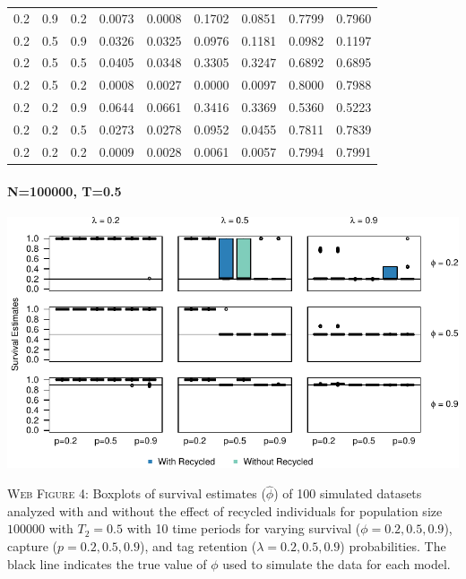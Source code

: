 \documentclass[]{article}
\let\oldparagraph\paragraph
\renewcommand{\paragraph}[1]{\oldparagraph{#1}\mbox{}}
\begin{document}
\begin{table}[ht]
{\begin{tabular}{rrrrrrrrr}
  0.2 & 0.9 & 0.2 & 0.0073 & 0.0008 & 0.1702 & 0.0851 & 0.7799 & 0.7960 \\ 
  0.2 & 0.5 & 0.9 & 0.0326 & 0.0325 & 0.0976 & 0.1181 & 0.0982 & 0.1197 \\ 
  0.2 & 0.5 & 0.5 & 0.0405 & 0.0348 & 0.3305 & 0.3247 & 0.6892 & 0.6895 \\ 
  0.2 & 0.5 & 0.2 & 0.0008 & 0.0027 & 0.0000 & 0.0097 & 0.8000 & 0.7988 \\ 
  0.2 & 0.2 & 0.9 & 0.0644 & 0.0661 & 0.3416 & 0.3369 & 0.5360 & 0.5223 \\ 
  0.2 & 0.2 & 0.5 & 0.0273 & 0.0278 & 0.0952 & 0.0455 & 0.7811 & 0.7839 \\ 
  0.2 & 0.2 & 0.2 & 0.0009 & 0.0028 & 0.0061 & 0.0057 & 0.7994 & 0.7991 \\ 
   \hline
\end{tabular}
}
\endgroup
\end{table}

\newpage

\paragraph{N=100000, T=0.5}\label{n100000-t0.5}

\includegraphics{Appendix_files/figure-latex/figure4_survival_GJSTL3-1.pdf}

\textsc{Web Figure 4:} Boxplots of survival estimates (\(\hat{\phi}\))
of 100 simulated datasets analyzed with and without the effect of
recycled individuals for population size \(100000\) with \(T_2=0.5\)
with 10 time periods for varying survival (\(\phi=0.2,0.5,0.9\)),
capture (\(p=0.2,0.5,0.9\)), and tag retention (\(\lambda=0.2,0.5,0.9\))
probabilities. The black line indicates the true value of \(\phi\) used
to simulate the data for each model.
\end{document}
